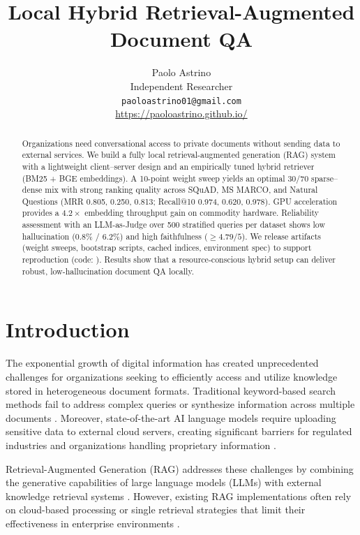 \documentclass[11pt]{article}
\title{Local Hybrid Retrieval-Augmented Document QA}
\author{Paolo Astrino \\
  Independent Researcher \\
  \texttt{paoloastrino01@gmail.com} \\
  \url{https://paoloastrino.github.io/}}
\begin{document}
\maketitle

\begin{abstract}
Organizations need conversational access to private documents without sending data to external services. We build a fully local retrieval-augmented generation (RAG) system with a lightweight client--server design and an empirically tuned hybrid retriever (BM25 + BGE embeddings). A 10-point weight sweep yields an optimal 30/70 sparse–dense mix with strong ranking quality across SQuAD, MS MARCO, and Natural Questions (MRR 0.805, 0.250, 0.813; Recall@10 0.974, 0.620, 0.978). GPU acceleration provides a $4.2\times$ embedding throughput gain on commodity hardware. Reliability assessment with an LLM-as-Judge over 500 stratified queries per dataset shows low hallucination (0.8\% / 6.2\%) and high faithfulness ($\ge 4.79/5$). We release artifacts (weight sweeps, bootstrap scripts, cached indices, environment spec) to support reproduction (code: \cite{localragrepo}). Results show that a resource-conscious hybrid setup can deliver robust, low-hallucination document QA locally.
\end{abstract}

\section{Introduction}

The exponential growth of digital information has created unprecedented challenges for organizations seeking to efficiently access and utilize knowledge stored in heterogeneous document formats. Traditional keyword-based search methods fail to address complex queries or synthesize information across multiple documents \cite{lewis2020rag}. Moreover, state-of-the-art AI language models require uploading sensitive data to external cloud servers, creating significant barriers for regulated industries and organizations handling proprietary information \cite{edpb,privacyinternational}.

Retrieval-Augmented Generation (RAG) addresses these challenges by combining the generative capabilities of large language models (LLMs) with external knowledge retrieval systems \cite{arxiv2410,arxiv24102}. However, existing RAG implementations often rely on cloud-based processing or single retrieval strategies that limit their effectiveness in enterprise environments \cite{hybridretrieval}.
\end{document}
